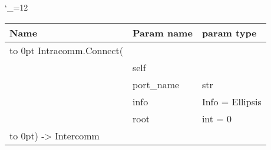 \begingroup \catcode`\_=12 \tt
\begin{tabular}{lll}
\toprule
\textrm{Name}&\textrm{Param name}&\textrm{param type}\\
\midrule
\hbox to 0pt {Intracomm.Connect(\hss}\\
& self\\
& port_name & str\\
& info & Info = Ellipsis\\
& root & int = 0\\
\hbox to 0pt{) -> Intercomm\hss}\\
\bottomrule
\end{tabular}
\endgroup
